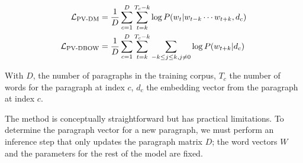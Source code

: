 \begin{align}
    \mathcal{L}_{\text{PV-DM}} &= \frac{1}{D}\sum_{c=1}^{D}\sum_{t=k}^{T_{c}-k}\log P(w_t | w_{t-k} \cdots w_{t+k}, d_c) \labeq{embeddings:pvdm}\\
    \mathcal{L}_{\text{PV-DBOW}} &= \frac{1}{D}\sum_{c=1}^{D}\sum_{t=k}^{T_{c}-k}\sum_{-k \leq j \leq k, j\neq 0}\log P(w_{t+k} | d_c) \labeq{embeddings:pvDBOW}
\end{align}

With $D$, the number of paragraphs in the training corpus, $T_c$ the number of words for the paragraph at index $c$, $d_c$ the embedding vector from the paragraph at index $c$.

The method is conceptually straightforward but has practical limitations. To determine the paragraph vector for a new paragraph, we must perform an inference step that only updates the paragraph matrix $D$; the word vectors $W$ and the parameters for the rest of the model are fixed.






